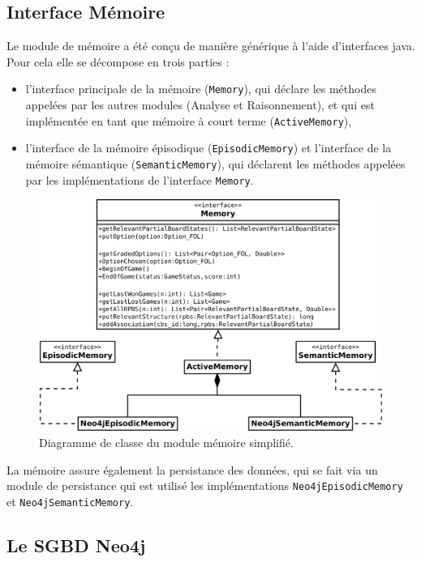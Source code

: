 \subsection{Interface Mémoire}

Le module de mémoire a été conçu de manière générique à l'aide d'interfaces java. Pour cela elle se décompose en trois parties :

\begin{itemize}
\item l'interface principale de la mémoire (\texttt{Memory}), qui déclare les méthodes appelées par les autres modules (Analyse et Raisonnement), et qui est implémentée en tant que mémoire à court terme (\texttt{ActiveMemory}),

\item l'interface de la mémoire épisodique (\texttt{EpisodicMemory}) et l'interface de la mémoire sémantique (\texttt{SemanticMemory}), qui déclarent les méthodes appelées par les implémentations de l'interface \texttt{Memory}.
\end{itemize}

\begin{figure}[H]
\includegraphics[width=\textwidth]{files/memoire/interface}
\caption{Diagramme de classe du module mémoire simplifié.}
\end{figure}

La mémoire assure également la persistance des données, qui se fait via un module de persistance qui est utilisé les implémentations \texttt{Neo4jEpisodicMemory} et \texttt{Neo4jSemanticMemory}. 

\subsection{Le \gls{SGBD} Neo4j}

